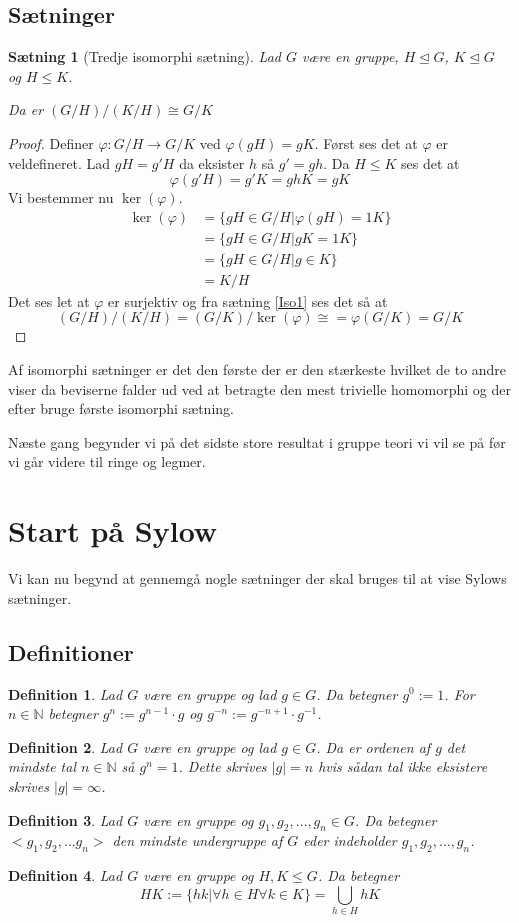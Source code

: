 \documentclass{article}
\newcommand{\N}{\mathbb{N}}
\newcommand{\inv}{^{-1}}
\newcommand{\too}{\rightarrow}
\newtheorem{setn}{Sætning}
\newtheorem{defi}{Definition}
\begin{document}
		\subsection*{Sætninger}
		\begin{setn}[Tredje isomorphi sætning] \label{Iso3}
			Lad $G$ være en gruppe, $H \unlhd G$, $K \unlhd G$ og $H \le K$.

			Da er $(G/H)/(K/H) \cong G/K$
		\end{setn}
		\begin{proof}
			Definer $\varphi: G/H \too G/K$ ved $\varphi(gH) = gK$. Først ses
			det at $\varphi$ er veldefineret. Lad $gH = g'H$ da eksister $h$ så
			$g' = gh$. Da $H \le K$ ses det at
			$$\varphi(g'H) = g'K = ghK = gK$$
			Vi bestemmer nu $\ker(\varphi)$.
			\begin{align*}
				\ker(\varphi) &= \{gH \in G/H| \varphi(gH) = 1K\} \\
				&= \{gH \in G/H| gK = 1K\} \\
				&= \{gH \in G/H| g \in K\} \\
				&= K/H
			\end{align*}
			Det ses let at $\varphi$ er surjektiv og fra sætning \ref{Iso1} ses det så at
			$$(G/H)/(K/H) = (G/K)/\ker(\varphi) \cong = \varphi(G/K) = G/K$$
		\end{proof}
		Af isomorphi sætninger er det den første der er den stærkeste hvilket de to andre viser
		da beviserne falder ud ved at betragte den mest trivielle homomorphi og der efter bruge
		første isomorphi sætning.

		Næste gang begynder vi på det sidste store resultat i gruppe teori vi vil se på før vi
		går videre til ringe og legmer.
	\newpage
	\section*{Start på Sylow}
		Vi kan nu begynd at gennemgå nogle sætninger der skal bruges til at vise
		Sylows sætninger.
		\subsection*{Definitioner}
		\begin{defi}
			Lad $G$ være en gruppe og lad $g \in G$.
			Da betegner $g^0 :=1$.
			For $n \in \N$ betegner $g^n := g^{n-1}\cdot g$ og $g^{-n} := g^{-n+1}\cdot g\inv$.
		\end{defi}
		\begin{defi}
			Lad $G$ være en gruppe og lad $g \in G$.
			Da er ordenen af $g$ det mindste tal $n \in \N$ så $g^n = 1$.
			Dette skrives $|g| = n$ hvis sådan tal ikke eksistere skrives $|g| = \infty$.
		\end{defi}
		\begin{defi}
			Lad $G$ være en gruppe og $g_1, g_2, \dots, g_n \in G$. Da betegner
			$<g_1,g_2,\dots g_n>$ den mindste undergruppe af $G$ eder indeholder
			$g_1, g_2, \dots, g_n$.
		\end{defi}
		\begin{defi}
			Lad $G$ være en gruppe og $H,K \le G$. Da betegner
			$$HK := \{hk | \forall h \in H \forall k \in K\} = \bigcup_{h\in H} hK$$
		\end{defi}
\end{document}
